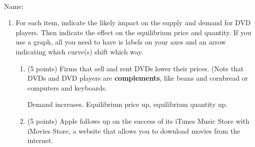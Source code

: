 \documentclass{article}
\newcommand{\mybigskip}{\vspace{1in}}
\begin{document}
\begin{EXAM}
\begin{itemize}
\begin{description}
\end{description}


\end{itemize}

\clearpage

\ \clearpage

\vspace*{-3cm}
\begin{flushright}
Name: \hspace*{1in}
\bigskip
\end{flushright}

\end{EXAM} 





\begin{enumerate}












\item \begin{EXAM} For each item, indicate the likely impact on the supply and demand for DVD players. Then indicate the effect on the equilibrium price and quantity. If you use a graph, all you need to have is labels on your axes and an arrow indicating which curve(s) shift which way. \end{EXAM} 

    \begin{enumerate}
    
    \item \begin{EXAM} (5 points) Firms that sell and rent DVDs lower their prices. (Note that DVDs and DVD players are \textbf{complements}, like beans and cornbread or computers and keyboards. \mybigskip \end{EXAM} 

\begin{KEY} Demand increases. Equilibrium price up, equilibrium quantity up.\end{KEY} 


    \item \begin{EXAM} (5 points) Apple follows up on the success of its iTunes Music Store with iMovies Store, a website that allows you to download movies from the internet. \mybigskip \end{EXAM} 


\end{enumerate}
\end{enumerate}
\end{document}
